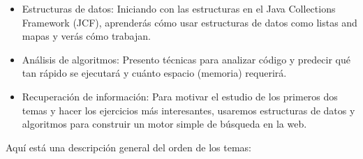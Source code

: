 \documentclass[12pt]{book}
\theoremstyle{exercise}
\begin{document}
\begin{itemize}

\item Estructuras de datos: Iniciando con las estructuras en el Java
Collections Framework (JCF), aprenderás cómo usar estructuras de datos
como listas and mapas y verás cómo trabajan.


\item Análisis de algoritmos: Presento técnicas para analizar código y
predecir qué tan rápido se ejecutará y cuánto espacio (memoria) requerirá.


\item Recuperación de información: Para motivar el estudio de los primeros
dos temas y hacer los ejercicios más interesantes, usaremos estructuras de
datos y algoritmos para construir un motor simple de búsqueda en la web.


\end{itemize}

Aquí está una descripción general del orden de los temas:
\end{document}
